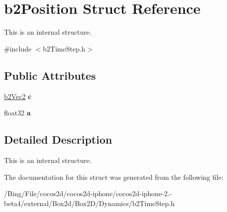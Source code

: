 \hypertarget{structb2_position}{\section{b2\-Position Struct Reference}
\label{structb2_position}
}


This is an internal structure.  




{\ttfamily \#include $<$b2\-Time\-Step.\-h$>$}

\subsection*{Public Attributes}
\begin{DoxyCompactItemize}
\item 
\hypertarget{structb2_position_a64b6d764d272385f84e4cac5ceb5af27}{\hyperlink{structb2_vec2}{b2\-Vec2} {\bfseries c}}\label{structb2_position_a64b6d764d272385f84e4cac5ceb5af27}

\item 
\hypertarget{structb2_position_a19d9362011e8c080059ac7f692cc7d8f}{float32 {\bfseries a}}\label{structb2_position_a19d9362011e8c080059ac7f692cc7d8f}

\end{DoxyCompactItemize}


\subsection{Detailed Description}
This is an internal structure. 

The documentation for this struct was generated from the following file\-:\begin{DoxyCompactItemize}
\item 
/\-Bing/\-File/cocos2d/cocos2d-\/iphone/cocos2d-\/iphone-\/2.-\/beta4/external/\-Box2d/\-Box2\-D/\-Dynamics/b2\-Time\-Step.\-h\end{DoxyCompactItemize}
